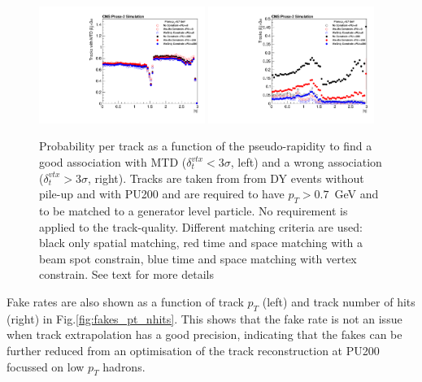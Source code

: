 \begin{figure}[!hbtp]
\centering
\includegraphics[width=0.48\textwidth]{fig/performance/goodTracks_vs_eta_fullComp.pdf}
\includegraphics[width=0.48\textwidth]{fig/performance/fakes_vs_eta_fullComp.pdf}
\caption{Probability per track as a function of the pseudo-rapidity to find a good association with MTD ($\delta_{t}^{vtx}<3\sigma$, left) and a wrong association ($\delta_{t}^{vtx}>3\sigma$, right). Tracks are taken from  from DY events without pile-up and with PU200 and are required to have $p_{T}>0.7$~GeV and to be matched to a generator level particle. No requirement is applied to the track-quality. Different matching criteria are used: black only spatial matching, red time and space matching with a beam spot constrain, blue time and space matching with vertex constrain. See text for more details}
\label{fig:fakes}
\end{figure}

Fake rates are also shown as a function of track $p_{T}$ (left) and track number of hits (right) in Fig.\ref{fig:fakes_pt_nhits}. This shows that the fake rate is not an issue when track extrapolation has a good precision, indicating that the fakes can be further reduced from an optimisation of the track reconstruction at PU200 focussed on low $p_{T}$ hadrons. 

